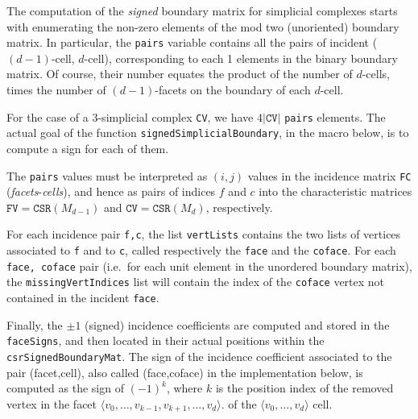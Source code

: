 \documentclass[11pt,oneside]{article}    %
\begin{document}
The computation of the \emph{signed} boundary matrix for simplicial complexes starts with enumerating the non-zero elements of the mod two (unoriented) boundary matrix. In particular, the \texttt{pairs} variable contains all the pairs of incident ($(d-1)$-cell, $d$-cell), corresponding to each 1 elements in the binary boundary matrix. Of course, their number equates the product of the number of $d$-cells, times the number of $(d-1)$-facets on the boundary of each $d$-cell. 

For the case of a 3-simplicial complex \texttt{CV}, we have $4|\texttt{CV}|$ \texttt{pairs} elements.  The actual goal of the function \texttt{signedSimplicialBoundary}, in the macro below, is to compute a sign for each of them.

The \texttt{pairs} values must be interpreted as $(i,j)$ values in the incidence matrix \texttt{FC} (\emph{facets}-\emph{cells}), and hence as pairs of indices $f$ and $c$ into the characteristic matrices $\texttt{FV}=\texttt{CSR}(M_{d-1})$ and $\texttt{CV}=\texttt{CSR}(M_{d})$, respectively.

For each incidence pair \texttt{f,c}, the list \texttt{vertLists}  contains the two lists of vertices associated to \texttt{f} and to \texttt{c}, called respectively the \texttt{face} and the \texttt{coface}. For each \texttt{face, coface} pair (i.e.~for each unit element in the unordered boundary matrix), the \texttt{missingVertIndices} list will contain the index of the \texttt{coface} vertex not contained in the incident \texttt{face}. 


Finally, the $\pm 1$ (signed) incidence coefficients are computed and stored in the \texttt{faceSigns}, and then located in their actual positions within the \texttt{csrSignedBoundaryMat}. The sign of the incidence coefficient associated to the pair (facet,cell), also called (face,coface) in the implementation below, is computed as the sign of $(-1)^k$, where $k$ is the position index of the removed vertex in the facet $\langle v_0, \ldots, v_{k-1}, v_{k+1}, \ldots, v_d \rangle$. of the $\langle v_0, \ldots, v_d \rangle$ cell.
\end{document}

